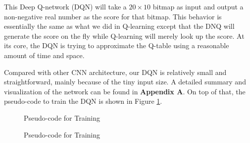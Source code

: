 \documentclass[letterpaper]{article} %
\makeatletter
\newcommand{\removelatexerror}{\let\@latex@error\@gobble}
\makeatother
\begin{document}
This Deep Q-network (DQN) will take a $20\times 10$ bitmap as input and output a non-negative real number as the score for that bitmap. This behavior is essentially the same as what we did in Q-learning except that the DNQ will generate the score on the fly while Q-learning will merely look up the score. At its core, the DQN is trying to approximate the Q-table using a reasonable amount of time and space. 

Compared with other CNN architecture, our DQN is relatively small and straightforward, mainly because of the tiny input size. A detailed summary and visualization of the network can be found in \textbf{Appendix A}. On top of that, the pseudo-code to train the DQN is shown in Figure \ref{fig:code1}.

\begin{figure}[h!]
	\centering
	\begin{minipage}{.95\linewidth}
    \removelatexerror%
		\begin{algorithm}[H]
			\DontPrintSemicolon
      \caption{Pseudo-code for Training}
		\end{algorithm}
	\end{minipage}
  \caption{Pseudo-code for Training}
  \label{fig:code1}
\end{figure}
\end{document}
